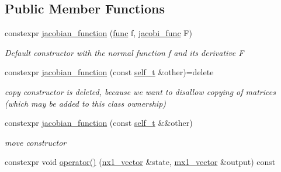 \subsection*{Public Member Functions}
\begin{DoxyCompactItemize}
\item 
\mbox{\label{classkafi_1_1jacobian__function_af37f73951723d1791a85a6da01f399a0}} 
constexpr \hyperlink{classkafi_1_1jacobian__function_af37f73951723d1791a85a6da01f399a0}{jacobian\+\_\+function} (\hyperlink{classkafi_1_1jacobian__function_a91cc300a9dba8c3e6787510d48e6fc37}{func} f, \hyperlink{classkafi_1_1jacobian__function_ac8f4a65fbe71eb34d1b7914024ad2d85}{jacobi\+\_\+func} F)
\begin{DoxyCompactList}\small\item\em Default constructor with the normal function {\ttfamily f} and its derivative {\ttfamily F} \end{DoxyCompactList}\item 
\mbox{\label{classkafi_1_1jacobian__function_a89f0c2ad30865138c34b4801e44ca2eb}} 
constexpr \hyperlink{classkafi_1_1jacobian__function_a89f0c2ad30865138c34b4801e44ca2eb}{jacobian\+\_\+function} (const \hyperlink{classkafi_1_1jacobian__function_a2981d3ce9a411bfc393aaf3ba822cdbe}{self\+\_\+t} \&other)=delete
\begin{DoxyCompactList}\small\item\em copy constructor is deleted, because we want to disallow copying of matrices (which may be added to this class ownership) \end{DoxyCompactList}\item 
\mbox{\label{classkafi_1_1jacobian__function_a8a4a94d30e8798b1a85fe47594c4ff13}} 
constexpr \hyperlink{classkafi_1_1jacobian__function_a8a4a94d30e8798b1a85fe47594c4ff13}{jacobian\+\_\+function} (const \hyperlink{classkafi_1_1jacobian__function_a2981d3ce9a411bfc393aaf3ba822cdbe}{self\+\_\+t} \&\&other)
\begin{DoxyCompactList}\small\item\em move constructor \end{DoxyCompactList}\item 
constexpr void \hyperlink{classkafi_1_1jacobian__function_a10675231d99de2d565af965efa4010e8}{operator()} (\hyperlink{classkafi_1_1jacobian__function_ad7e7a8fbfa3e2785798bd46e5307ca65}{nx1\+\_\+vector} \&state, \hyperlink{classkafi_1_1jacobian__function_ad8e32b40bc05db5ee53705a30257761d}{mx1\+\_\+vector} \&output) const

\end{DoxyCompactItemize}
